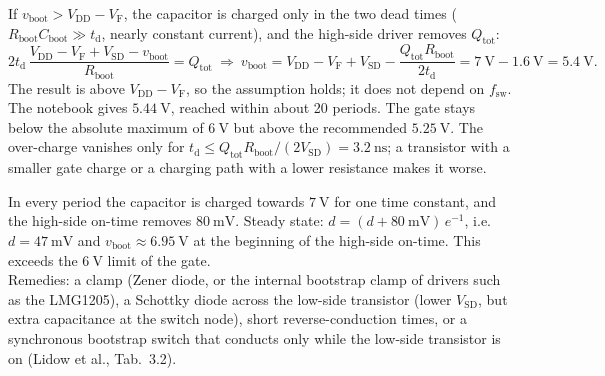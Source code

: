
\begin{solutionblock}
	If $v_\mathrm{boot}>V_\mathrm{DD}-V_\mathrm{F}$, the capacitor is charged only in the two dead times ($R_\mathrm{boot}C_\mathrm{boot}\gg t_\mathrm{d}$, nearly constant current), and the high-side driver removes $Q_\mathrm{tot}$:
	\begin{equation}
		2t_\mathrm{d}\,\frac{V_\mathrm{DD}-V_\mathrm{F}+V_\mathrm{SD}-v_\mathrm{boot}}{R_\mathrm{boot}}=Q_\mathrm{tot}
		\ \Rightarrow\ v_\mathrm{boot}=V_\mathrm{DD}-V_\mathrm{F}+V_\mathrm{SD}-\frac{Q_\mathrm{tot}R_\mathrm{boot}}{2t_\mathrm{d}}=\SI{7}{\volt}-\SI{1.6}{\volt}=\SI{5.4}{\volt}.
	\end{equation}
	The result is above $V_\mathrm{DD}-V_\mathrm{F}$, so the assumption holds; it does not depend on $f_\mathrm{sw}$. The notebook gives $\SI{5.44}{\volt}$, reached within about 20 periods. The gate stays below the absolute maximum of $\SI{6}{\volt}$ but above the recommended $\SI{5.25}{\volt}$. The over-charge vanishes only for $t_\mathrm{d}\leq Q_\mathrm{tot}R_\mathrm{boot}/(2V_\mathrm{SD})=\SI{3.2}{\nano\second}$; a transistor with a smaller gate charge or a charging path with a lower resistance makes it worse.
\end{solutionblock}


\begin{solutionblock}
	In every period the capacitor is charged towards $\SI{7}{\volt}$ for one time constant, and the high-side on-time removes $\SI{80}{\milli\volt}$. Steady state: $d=(d+\SI{80}{\milli\volt})\,e^{-1}$, i.e.\ $d=\SI{47}{\milli\volt}$ and $v_\mathrm{boot}\approx\SI{6.95}{\volt}$ at the beginning of the high-side on-time. This exceeds the $\SI{6}{\volt}$ limit of the gate.\\
	Remedies: a clamp (Zener diode, or the internal bootstrap clamp of drivers such as the LMG1205), a Schottky diode across the low-side transistor (lower $V_\mathrm{SD}$, but extra capacitance at the switch node), short reverse-conduction times, or a synchronous bootstrap switch that conducts only while the low-side transistor is on (Lidow et al., Tab.\ 3.2).
\end{solutionblock}

